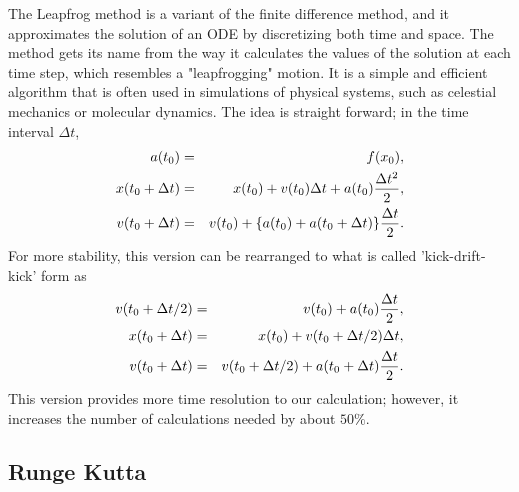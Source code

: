 \documentclass{article}
\begin{document}
The Leapfrog method is a variant of the finite difference method, and it approximates the solution of an ODE by discretizing both time and space. The method gets its name from the way it calculates the values of the solution at each time step, which resembles a "leapfrogging" motion. 
It is a simple and efficient algorithm that is often used in simulations of physical systems, such as celestial mechanics or molecular dynamics.
The idea is straight forward; in the time interval $\Delta t$, 
\vspace{-10pt}\begin{eqnarray}
    a(t_0) &=& f(x_0)   , \\
    x(t_0 + \Delta t) &=& x(t_0) + v(t_0)\Delta t + a(t_0)\frac{\Delta t^2}{2}   ,\label{eq:leapfrog_sync_x}\\
    v(t_0 + \Delta t) &=& v(t_0) + \{ a(t_0) + a(t_0 + \Delta t)\}\frac{\Delta t}{2} . \label{eq:leapfrog_sync_v}
\vspace{-10pt}\end{eqnarray}
For more stability, this version can be rearranged to what is called 'kick-drift-kick' form as
\vspace{-10pt}\begin{eqnarray} \label{eq:leapfrog}
    v(t_0 + \Delta t/2) &=& v(t_0) +  a(t_0)\frac{\Delta t}{2}   ,  \\
    x(t_0 + \Delta t) &=& x(t_0) + v(t_0 + \Delta t/2)\Delta t   , \\
    v(t_0 + \Delta t) &=& v(t_0 + \Delta t/2) + a(t_0 + \Delta t)\frac{\Delta t}{2} . 
\vspace{-10pt}\end{eqnarray}
This version provides more time resolution to our calculation; however, it increases the number of calculations needed by about $50\%$.

\subsection{Runge Kutta} \label{sec:rungekutta}
\end{document}
